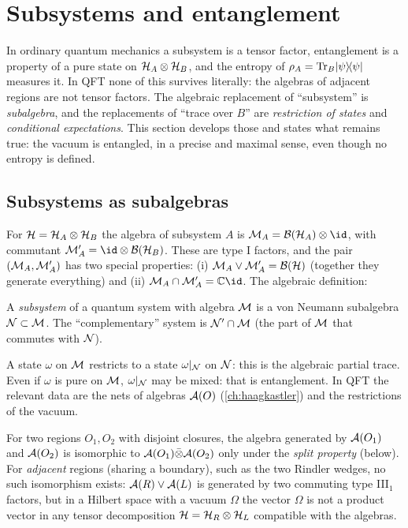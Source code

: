 \section{Subsystems and entanglement}\label{ch:subsystems}

\mshift{7mm}\begin{physmotiv}
In ordinary quantum mechanics a subsystem is a tensor factor, entanglement is a property of a pure state on $\mathcal{H}_A\otimes\mathcal{H}_B$, and the entropy of $\rho_A=\operatorname{Tr}_B\lvert \psi\rangle\!\langle \psi\rvert$ measures it. In QFT none of this survives literally: the algebras of adjacent regions are not tensor factors. The algebraic replacement of ``subsystem'' is \emph{subalgebra}, and the replacements of ``trace over $B$'' are \emph{restriction of states} and \emph{conditional expectations}. This section develops those and states what remains true: the vacuum is entangled, in a precise and maximal sense, even though no entropy is defined.
\end{physmotiv}

\subsection{Subsystems as subalgebras}

For $\mathcal{H}=\mathcal{H}_A\otimes\mathcal{H}_B$ the algebra of subsystem $A$ is $\M_A=\Bnd{\HH_A}\otimes\id$, with commutant $\M_A'=\id\otimes\Bnd{\HH_B}$. These are type I factors, and the pair $(\mathcal{M}_A,\mathcal{M}_A')$ has two special properties: (i) $\mathcal{M}_A\vee\mathcal{M}_A'=\mathcal{B}(\mathcal{H})$ (together they generate everything) and (ii) $\M_A\cap\M_A'=\C\id$. The algebraic definition:

\begin{definition}
A \emph{subsystem} of a quantum system with algebra $\mathcal{M}$ is a von Neumann subalgebra $\mathcal{N}\subset\mathcal{M}$. The ``complementary'' system is $\mathcal{N}'\cap\mathcal{M}$ (the part of $\mathcal{M}$ that commutes with $\mathcal{N}$).
\end{definition}

A state $\omega$ on $\mathcal{M}$ restricts to a state $\omega|_{\mathcal{N}}$ on $\mathcal{N}$: this is the algebraic partial trace. Even if $\omega$ is pure on $\mathcal{M}$, $\omega|_{\mathcal{N}}$ may be mixed: that is entanglement. In QFT the relevant data are the nets of algebras $\mathcal{A}(O)$ (\cref{ch:haagkastler}) and the restrictions of the vacuum.

\begin{whatwrong}
For two regions $O_1,O_2$ with disjoint closures, the algebra generated by $\mathcal{A}(O_1)$ and $\mathcal{A}(O_2)$ is isomorphic to $\mathcal{A}(O_1)\bar\otimes\mathcal{A}(O_2)$ only under the \emph{split property} (below). For \emph{adjacent} regions (sharing a boundary), such as the two Rindler wedges, no such isomorphism exists: $\mathcal{A}(R)\vee\mathcal{A}(L)$ is generated by two commuting type III$_1$ factors, but in a Hilbert space with a vacuum $\Omega$ the vector $\Omega$ is not a product vector in any tensor decomposition $\mathcal{H}=\mathcal{H}_R\otimes\mathcal{H}_L$ compatible with the algebras.
\end{whatwrong}

